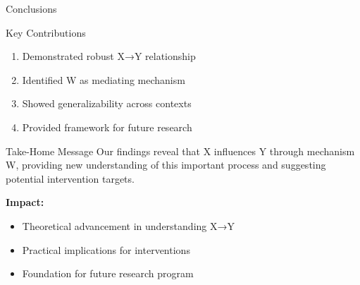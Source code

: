 \documentclass[aspectratio=169,11pt]{beamer}
\begin{document}
\begin{frame}{Conclusions}
  \begin{exampleblock}{Key Contributions}
    \begin{enumerate}
      \item Demonstrated robust X→Y relationship
      \item Identified W as mediating mechanism
      \item Showed generalizability across contexts
      \item Provided framework for future research
    \end{enumerate}
  \end{exampleblock}
  
  \vspace{0.5cm}
  
  \begin{block}{Take-Home Message}
    Our findings reveal that X influences Y through mechanism W, providing new understanding of this important process and suggesting potential intervention targets.
  \end{block}
  
  \vspace{0.5cm}
  
  \textbf{Impact:}
  \begin{itemize}
    \item Theoretical advancement in understanding X→Y
    \item Practical implications for interventions
    \item Foundation for future research program
  \end{itemize}
\end{frame}
\end{document}
